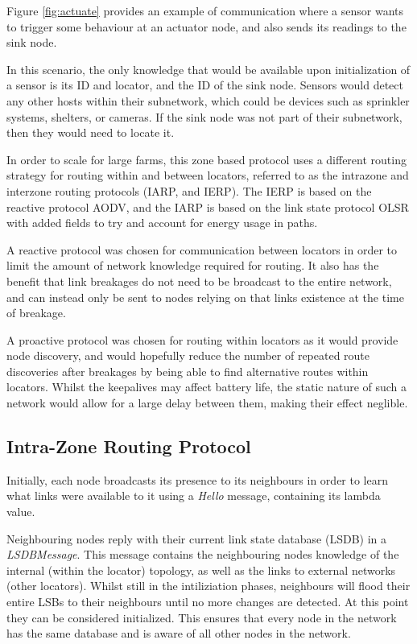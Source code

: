 \documentclass[12pt]{article}
\begin{document}
Figure \ref{fig:actuate} provides an example of communication where a sensor wants to trigger some behaviour at an actuator node, and also sends its readings to the sink node. 

In this scenario, the only knowledge that would be available upon initialization of a sensor is its ID and locator, and the ID of the sink node. Sensors would detect any other hosts within their subnetwork, which could be devices such as sprinkler systems, shelters, or cameras. If the sink node was not part of their subnetwork, then they would need to locate it.

In order to scale for large farms, this zone based protocol uses a different routing strategy for routing within and between locators, referred to as the intrazone and interzone routing protocols (IARP, and IERP). The IERP is based on the reactive protocol AODV, and the IARP is based on the link state protocol OLSR with added fields to try and account for energy usage in paths. 

A reactive protocol was chosen for communication between locators in order to limit the amount of network knowledge required for routing. It also has the benefit that link breakages do not need to be broadcast to the entire network, and can instead only be sent to nodes relying on that links existence at the time of breakage.

A proactive protocol was chosen for routing within locators as it would provide node discovery, and would hopefully reduce the number of repeated route discoveries after breakages by being able to find alternative routes within locators. Whilst the keepalives may affect battery life, the static nature of such a network would allow for a large delay between them, making their effect neglible.

\subsection{Intra-Zone Routing Protocol}

Initially, each node broadcasts its presence to its neighbours in order to learn what links were available to it using a \emph{Hello} message, containing its lambda value. 

Neighbouring nodes reply with their current link state database (LSDB) in a \emph{LSDBMessage}. This message contains the neighbouring nodes knowledge of the internal (within the locator) topology, as well as the links to external networks (other locators). Whilst still in the intiliziation phases, neighbours will flood their entire LSBs to their neighbours until no more changes are detected. At this point they can be considered initialized. This ensures that every node in the network has the same database and is aware of all other nodes in the network.
\end{document}
